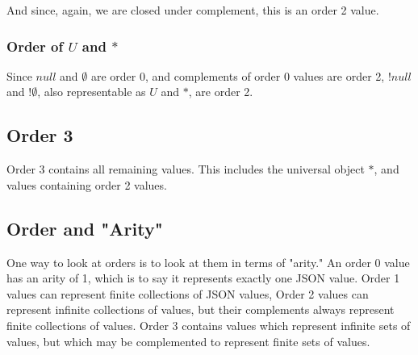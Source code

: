 \documentclass[letterpaper]{article}
\begin{document}
And since, again, we are closed under complement, this is an order 2 value.

\subsubsection{Order of \(U\) and \(*\)}

Since \(null\) and \(\emptyset\) are order 0, and complements of order 0 values
are order 2, \(!null\) and \(!\emptyset\), also representable as \(U\) and
\(*\), are order 2.

\subsection{Order 3}
Order 3 contains all remaining values. This includes the universal object \({ *
}\), and values containing order 2 values.

\subsection{Order and "Arity"}

One way to look at orders is to look at them in terms of "arity." An order 0
value has an arity of 1, which is to say it represents exactly one JSON value.
Order 1 values can represent finite collections of JSON values, Order 2 values
can represent infinite collections of values, but their complements always
represent finite collections of values. Order 3 contains values which represent
infinite sets of values, but which may be complemented to represent finite sets
of values.
\end{document}
